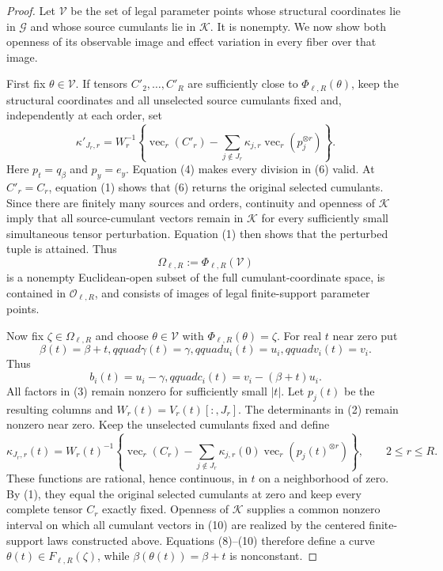 \documentclass{article}
\begin{document}
\begin{proof}
Let \(\mathcal V\) be the set of legal parameter points whose structural coordinates lie in \(\mathcal G\) and whose source cumulants lie in \(\mathcal K\).  It is nonempty.  We now show both openness of its observable image and effect variation in every fiber over that image.

First fix \(\theta\in\mathcal V\).  If tensors \(C'_2,\ldots,C'_R\) are sufficiently close to \(\Phi_{\ell,R}(\theta)\), keep the structural coordinates and all unselected source cumulants fixed and, independently at each order, set
\[
 \kappa'_{J_r,r}
 =W_r^{-1}\left\{\operatorname{vec}_r(C'_r)
 -\sum_{j\notin J_r}\kappa_{j,r}\operatorname{vec}_r(p_j^{\otimes r})\right\}.
 \tag{6}
\]
Here \(p_t=q_\beta\) and \(p_y=e_y\).  Equation (4) makes every division in (6) valid.  At \(C'_r=C_r\), equation (1) shows that (6) returns the original selected cumulants.  Since there are finitely many sources and orders, continuity and openness of \(\mathcal K\) imply that all source-cumulant vectors remain in \(\mathcal K\) for every sufficiently small simultaneous tensor perturbation.  Equation (1) then shows that the perturbed tuple is attained.  Thus
\[
 \Omega_{\ell,R}:=\Phi_{\ell,R}(\mathcal V)
 \tag{7}
\]
is a nonempty Euclidean-open subset of the full cumulant-coordinate space, is contained in \(\mathcal O_{\ell,R}\), and consists of images of legal finite-support parameter points.

Now fix \(\zeta\in\Omega_{\ell,R}\) and choose \(\theta\in\mathcal V\) with \(\Phi_{\ell,R}(\theta)=\zeta\).  For real \(t\) near zero put
\[
 \beta(t)=\beta+t,qquad
 \gamma(t)=\gamma,qquad
 u_i(t)=u_i,qquad
 v_i(t)=v_i.
 \tag{8}
\]
Thus
\[
 b_i(t)=u_i-\gamma,qquad
 c_i(t)=v_i-(\beta+t)u_i.
 \tag{9}
\]
All factors in (3) remain nonzero for sufficiently small \(|t|\).  Let \(p_j(t)\) be the resulting columns and \(W_r(t)=V_r(t)[:,J_r]\).  The determinants in (2) remain nonzero near zero.  Keep the unselected cumulants fixed and define
\[
 \kappa_{J_r,r}(t)
 =W_r(t)^{-1}\left\{\operatorname{vec}_r(C_r)
 -\sum_{j\notin J_r}\kappa_{j,r}(0)
       \operatorname{vec}_r(p_j(t)^{\otimes r})\right\},
 \qquad 2\le r\le R.
 \tag{10}
\]
These functions are rational, hence continuous, in \(t\) on a neighborhood of zero.  By (1), they equal the original selected cumulants at zero and keep every complete tensor \(C_r\) exactly fixed.  Openness of \(\mathcal K\) supplies a common nonzero interval on which all cumulant vectors in (10) are realized by the centered finite-support laws constructed above.  Equations (8)--(10) therefore define a curve \(\theta(t)\in F_{\ell,R}(\zeta)\), while \(\beta(\theta(t))=\beta+t\) is nonconstant.


\end{proof}
\end{document}
